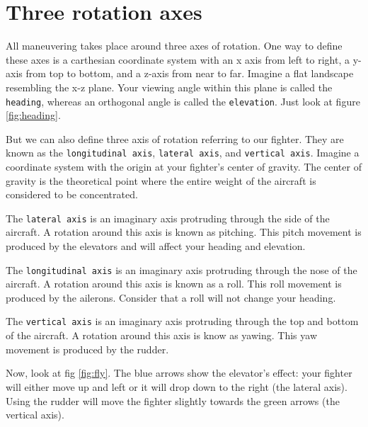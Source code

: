 \section{Three rotation axes}
\label{sec:axis}

All maneuvering takes place around three axes of rotation.
One way to define these axes is a carthesian coordinate system
with an x axis from left to right,
a y-axis from top to bottom, and a z-axis from near to far.
Imagine a flat landscape resembling the x-z plane.
Your viewing angle within this plane is called the \texttt{heading},
whereas an orthogonal angle is called the \texttt{elevation}.
Just look at figure \ref{fig:heading}.

But we can also define three axis of rotation referring to our fighter.
They are known as the \texttt{longitudinal axis}, \texttt{lateral axis},
and \texttt{vertical axis}.
Imagine a coordinate system with the origin at your fighter's center of gravity.
The center of gravity is the theoretical point where the entire weight
of the aircraft is considered to be concentrated.

The \texttt{lateral axis} is an imaginary axis protruding through the side
of the aircraft. A rotation around this axis is known as pitching.
This pitch movement is produced by the elevators and
will affect your heading and elevation.

The \texttt{longitudinal axis} is an imaginary axis protruding through
the nose of the aircraft.
A rotation around this axis is known as a roll.
This roll movement is produced by the ailerons.
Consider that a roll will not change your heading.

The \texttt{vertical axis} is an imaginary axis protruding through the top and
bottom
of the aircraft. A rotation around this axis is know as yawing.
This yaw movement is produced by the rudder.

Now, look at fig \ref{fig:fly}.
The blue arrows show the elevator's effect: your fighter will
either move up and left or it will drop down to the right
(the lateral axis).
Using the rudder will move the fighter slightly towards the green arrows
(the vertical axis).

